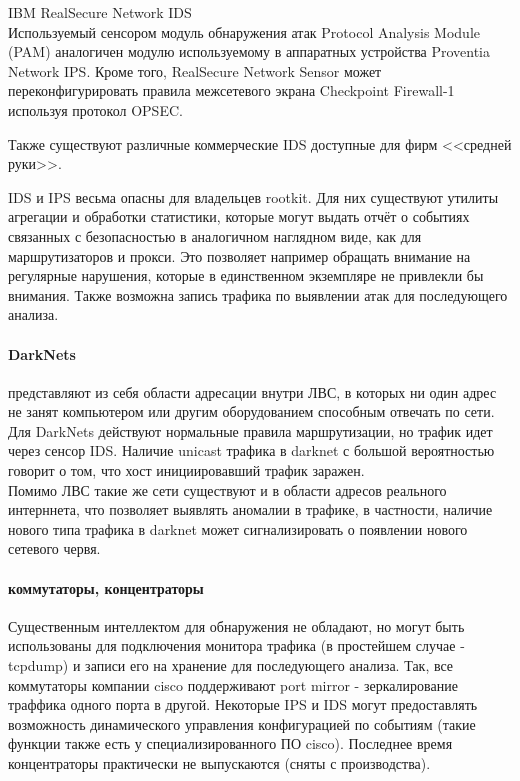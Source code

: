IBM RealSecure Network IDS\\
Используемый сенсором модуль обнаружения атак Protocol Analysis Module (PAM) аналогичен модулю используемому в аппаратных устройства Proventia Network IPS. Кроме того, RealSecure Network Sensor может переконфигурировать правила межсетевого экрана Checkpoint Firewall-1 используя протокол OPSEC.

Также существуют различные коммерческие IDS доступные для фирм <<средней
руки>>.

IDS и IPS весьма опасны для владельцев rootkit. Для них существуют утилиты
агрегации и обработки статистики, которые могут выдать отчёт о событиях
связанных с безопасностью в аналогичном наглядном виде, как для
маршрутизаторов и прокси. Это позволяет например обращать внимание на
регулярные нарушения, которые в единственном экземпляре не привлекли бы
внимания. Также возможна запись трафика по выявлении атак для последующего анализа.

\paragraph{DarkNets}
\label{darknet}
 представляют из себя области адресации внутри ЛВС, в которых
ни один адрес не занят компьютером или другим оборудованием способным отвечать по
сети. Для DarkNets действуют нормальные правила маршрутизации, но трафик идет
через сенсор IDS. Наличие unicast трафика в darknet с большой вероятностью говорит
 о том, что хост инициировавший трафик заражен.\\

Помимо ЛВС такие же сети существуют и в области адресов реального интерннета, что
 позволяет выявлять аномалии в трафике, в частности, наличие нового типа трафика в
darknet может сигнализировать о появлении нового сетевого червя.\\


\paragraph{коммутаторы, концентраторы}
Существенным интеллектом для обнаружения не обладают, но могут быть
использованы для подключения монитора трафика (в простейшем случае -
tcpdump) и записи его на хранение для последующего анализа. Так, все
коммутаторы компании cisco поддерживают port mirror - зеркалирование
траффика одного порта в другой. Некоторые IPS и IDS могут предоставлять возможность
динамического управления конфигурацией по событиям (такие функции
также есть у специализированного ПО cisco). Последнее время концентраторы
 практически не выпускаются (сняты с производства).

